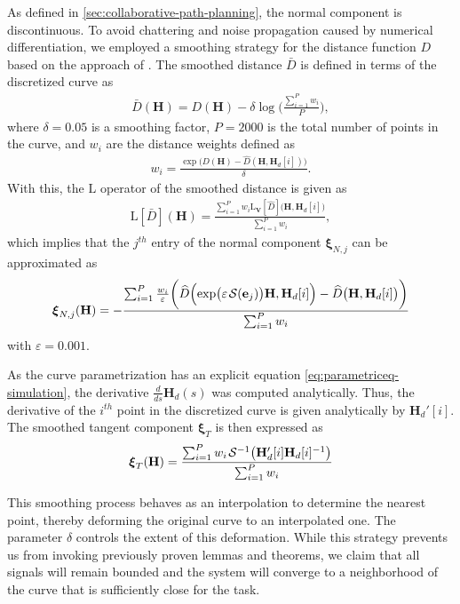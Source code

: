 As defined in \cref{sec:collaborative-path-planning}, the normal component is discontinuous. To avoid chattering and noise propagation caused by numerical differentiation, we employed a smoothing strategy for the distance function $D$ based on the approach of \citet{Goncalves2024}. The smoothed distance $\bar{D}$ is defined in terms of the discretized curve as
\begin{align}
    \bar{D}(\mathbf{H}) = D(\mathbf{H}) - \delta\log\biggl(\frac{\sum_{i=1}^{P}w_i}{P}\biggr),
\end{align}
where $\delta=0.05$ is a smoothing factor, $P=\num{2000}$ is the total number of points in the curve, and $w_i$ are the distance weights defined as
\begin{align}
    w_i = \frac{\exp\bigl(D(\mathbf{H}) - \widehat{D}(\mathbf{H}, \mathbf{H}_d[i])\bigr)}{\delta}.
\end{align}
With this, the $\text{L}$ operator of the smoothed distance is given as
\begin{align}
    \text{L}[\bar{D}](\mathbf{H}) = \frac{\sum_{i=1}^{P}w_i\text{L}_\mathbf{V}[\widehat{D}]\bigl(\mathbf{H}, \mathbf{H}_d[i]\bigr)}{\sum_{i=1}^{P}w_i},
\end{align}
which implies that the $j^{th}$ entry of the normal component $\boldsymbol{\xi}_{N,j}$ can be approximated as
\begin{align}
    \boldsymbol{\xi}_{N,j}(\mathbf{H}) = -\frac{\sum_{i=1}^{P} \frac{w_i}{\varepsilon}\biggl(\widehat{D}\Bigl(\exp\bigl(\varepsilon\SL[\mathbf{e}_j]\bigr)\mathbf{H}, \mathbf{H}_d[i]\Bigr)- \widehat{D}\bigl(\mathbf{H}, \mathbf{H}_d[i]\bigr)\biggr)}{\sum_{i=1}^{P}w_i}
\end{align}
with $\varepsilon=0.001$.

As the curve parametrization has an explicit equation \eqref{eq:parametriceq-simulation}, the derivative $\frac{d}{ds}\mathbf{H}_d(s)$ was computed analytically. Thus, the derivative of the $i^{th}$ point in the discretized curve is given analytically by $\mathbf{H}_d'[i]$. The smoothed tangent component $\boldsymbol{\xi}_T$ is then expressed as
\begin{align}
    \boldsymbol{\xi}_T(\mathbf{H}) = \frac{\sum_{i=1}^{P} w_i\invSL\bigl(\mathbf{H}_d'[i]\mathbf{H}_d[i]^{-1}\bigr)}{\sum_{i=1}^{P} w_i}
\end{align}

This smoothing process behaves as an interpolation to determine the nearest point, thereby deforming the original curve to an interpolated one. The parameter $\delta$ controls the extent of this deformation. While this strategy prevents us from invoking previously proven lemmas and theorems, we claim that all signals will remain bounded and the system will converge to a neighborhood of the curve that is sufficiently close for the task.

